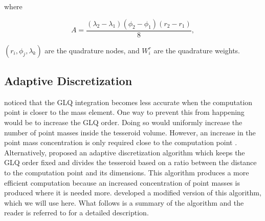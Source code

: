 \documentclass[extra, referee]{gji}
\begin{document}

\noindent where

\begin{equation}
    A =
    \frac{(\lambda_2 - \lambda_1)(\phi_2 - \phi_1)(r_2 - r_1)}{8},
\end{equation}

\noindent $(r_i, \phi_j, \lambda_k)$ are the quadrature nodes, and $W_i^r$ are the
quadrature weights.


\subsection{Adaptive Discretization}

\citet{Ku1977} noticed that the GLQ integration
becomes less accurate when the computation point is closer to the
mass element.
One way to prevent this from happening would be to increase the GLQ order.
Doing so would uniformly increase the number of point masses inside the
tesseroid volume.
However, an increase in the point mass concentration is only required close to the
computation point \citep{Uieda2016}.
Alternatively, \citet{Li2011} proposed an adaptive
discretization algorithm which keeps the GLQ order fixed and divides the
tesseroid based on a ratio between the distance to the computation
point and its dimensions.
This algorithm produces a more efficient computation because an increased concentration
of point masses is produced where it is needed more.
\citet{Uieda2016} developed a modified version of this algorithm, which we will use
here.
What follows is a summary of the algorithm and the reader is referred to
\citet{Uieda2016} for a detailed description.
\end{document}
